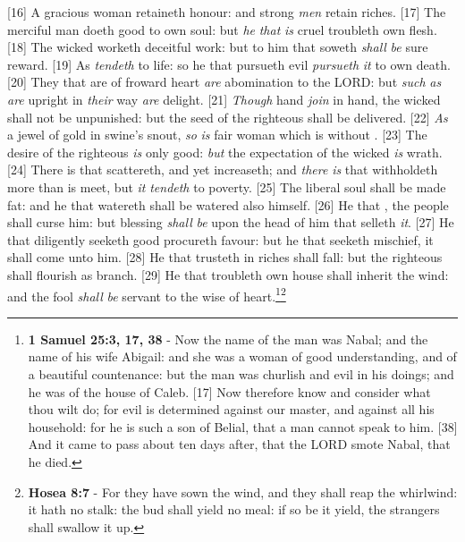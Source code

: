 [16] \textcolor[cmyk]{0.99998,1,0,0}{A gracious woman retaineth honour: and strong \emph{men} retain riches.}
[17] \textcolor[cmyk]{0.99998,1,0,0}{The merciful man doeth good to  own soul: but \emph{he} \emph{that} \emph{is} cruel troubleth  own flesh.}
[18] \textcolor[cmyk]{0.99998,1,0,0}{The wicked worketh  deceitful work: but to him that soweth  \emph{shall} \emph{be}  sure reward.}
[19] \textcolor[cmyk]{0.99998,1,0,0}{As  \emph{tendeth} to life: so he that pursueth evil \emph{pursueth} \emph{it} to  own death.}
[20] \textcolor[cmyk]{0.99998,1,0,0}{They that are of  froward heart \emph{are} abomination to the LORD: but \emph{such} \emph{as} \emph{are} upright in \emph{their} way \emph{are}  delight.}
[21] \textcolor[cmyk]{0.99998,1,0,0}{\emph{Though} hand \emph{join} in hand, the wicked shall not be unpunished: but the seed of the righteous shall be delivered.}
[22] \textcolor[cmyk]{0.99998,1,0,0}{\emph{As} a jewel of gold in  swine's snout, \emph{so} \emph{is}  fair woman which is without .}
[23] \textcolor[cmyk]{0.99998,1,0,0}{The desire of the righteous \emph{is} only good: \emph{but} the expectation of the wicked \emph{is} wrath.}
[24] \textcolor[cmyk]{0.99998,1,0,0}{There is that scattereth, and yet increaseth; and \emph{there} \emph{is} that withholdeth more than is meet, but \emph{it} \emph{tendeth} to poverty.}
[25] \textcolor[cmyk]{0.99998,1,0,0}{The liberal soul shall be made fat: and he that watereth shall be watered also himself.}
[26] \textcolor[cmyk]{0.99998,1,0,0}{He that , the people shall curse him: but blessing \emph{shall} \emph{be} upon the head of him that selleth \emph{it}.}
[27] \textcolor[cmyk]{0.99998,1,0,0}{He that diligently seeketh good procureth favour: but he that seeketh mischief, it shall come unto him.}
[28] \textcolor[cmyk]{0.99998,1,0,0}{He that trusteth in  riches shall fall: but the righteous shall flourish as  branch.}
[29] \textcolor[cmyk]{0.99998,1,0,0}{He that troubleth  own house shall inherit the wind: and the fool \emph{shall} \emph{be} servant to the wise of heart.}\footnote{\textbf{1 Samuel 25:3, 17, 38} - Now the name of the man was Nabal; and the name of his wife Abigail: and she was a woman of good understanding, and of a beautiful countenance: but the man was churlish and evil in his doings; and he was of the house of Caleb. [17] Now therefore know and consider what thou wilt do; for evil is determined against our master, and against all his household: for he is such a son of Belial, that a man cannot speak to him. [38] And it came to pass about ten days after, that the LORD smote Nabal, that he died.}\footnote{\textbf{Hosea 8:7} - For they have sown the wind, and they shall reap the whirlwind: it hath no stalk: the bud shall yield no meal: if so be it yield, the strangers shall swallow it up.}
